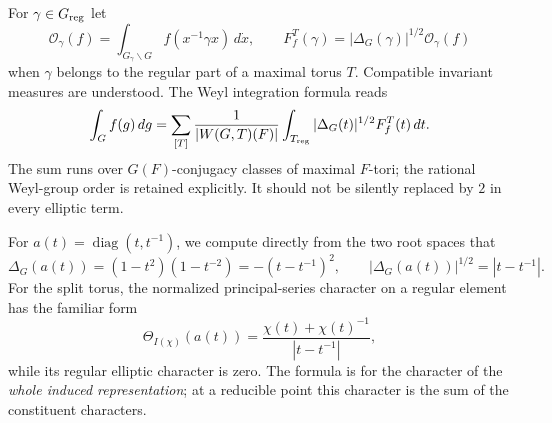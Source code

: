 \documentclass[12pt,letterpaper]{amsart}
\numberwithin{equation}{section}
\theoremstyle{definition}
\theoremstyle{remark}
\newcommand{\diag}{\operatorname{diag}}
\begin{document}
For $\gamma\in G_{\rm reg}$ let
\[
\mathcal O_\gamma(f)=\int_{G_\gamma\backslash G} f(x^{-1}\gamma x)\,d\dot x,
\qquad
F_f^T(\gamma)=|\Delta_G(\gamma)|^{1/2}\mathcal O_\gamma(f)
\]
when $\gamma$ belongs to the regular part of a maximal torus $T$.  Compatible invariant measures are understood.  The Weyl integration formula reads
\begin{equation}\label{eq:weyl}
\int_G f(g)\,dg=\sum_{[T]}\frac{1}{|W(G,T)(F)|}
\int_{T_{\rm reg}} |\Delta_G(t)|^{1/2}F_f^T(t)\,dt.
\end{equation}
The sum runs over $G(F)$-conjugacy classes of maximal $F$-tori; the rational Weyl-group order is retained explicitly.  It should not be silently replaced by $2$ in every elliptic term.

For $a(t)=\diag(t,t^{-1})$, we compute directly from the two root spaces that
\begin{equation}\label{eq:disc}
\Delta_G(a(t))=(1-t^2)(1-t^{-2})=-(t-t^{-1})^2,
\qquad |\Delta_G(a(t))|^{1/2}=|t-t^{-1}|.
\end{equation}
For the split torus, the normalized principal-series character on a regular element has the familiar form
\begin{equation}\label{eq:pschar}
\Theta_{I(\chi)}(a(t))=\frac{\chi(t)+\chi(t)^{-1}}{|t-t^{-1}|},
\end{equation}
while its regular elliptic character is zero.  The formula is for the character of the \emph{whole induced representation}; at a reducible point this character is the sum of the constituent characters.
\end{document}
